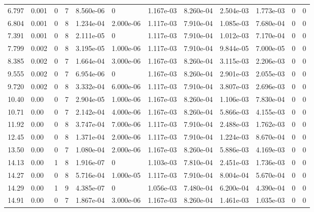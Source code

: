 \documentclass[preview]{standalone}
\begin{document}
{{\begin{tabular}{L{1.2cm}C{1.2cm} C{0.3cm}C{0.5cm} C{1.4cm}C{1.4cm} C{1.4cm}C{1.4cm} C{1.6cm}C{1.6cm} C{1.6cm}C{1.6cm}}
  6.797  &  0.001  & 0     &  7 &  8.560e-06  & 0  &  1.167e-03&   8.260e-04& 2.504e-03 & 1.773e-03   &  0 & 0  \\ 
  6.804  &  0.001  & 0     &  8 &  1.234e-04  & 2.000e-06  &  1.117e-03&   7.910e-04& 1.085e-03 & 7.680e-04   &  0 & 0  \\ 
  7.391  &  0.001  & 0     &  8 &  2.111e-05  & 0  &  1.117e-03&   7.910e-04& 1.012e-03 & 7.170e-04   &  0 & 0  \\ 
  7.799  &  0.002  & 0     &  8 &  3.195e-05  & 1.000e-06  &  1.117e-03&   7.910e-04& 9.844e-05 & 7.000e-05   &  0 & 0  \\ 
  8.385  &  0.002  & 0     &  7 &  1.664e-04  & 3.000e-06  &  1.167e-03&   8.260e-04& 3.115e-03 & 2.206e-03   &  0 & 0  \\ 
  9.555  &  0.002  & 0     &  7 &  6.954e-06  & 0  &  1.167e-03&   8.260e-04& 2.901e-03 & 2.055e-03   &  0 & 0  \\ 
  9.720  &  0.002  & 0     &  8 &  3.332e-04  & 6.000e-06  &  1.117e-03&   7.910e-04& 3.807e-03 & 2.696e-03   &  0 & 0  \\ 
  10.40  &  0.00  & 0     &  7 &  2.904e-05  & 1.000e-06  &  1.167e-03&   8.260e-04& 1.106e-03 & 7.830e-04   &  0 & 0  \\ 
  10.71  &  0.00  & 0     &  7 &  2.142e-04  & 4.000e-06  &  1.167e-03&   8.260e-04& 5.866e-03 & 4.155e-03   &  0 & 0  \\ 
  11.92  &  0.00  & 0     &  8 &  3.747e-04  & 7.000e-06  &  1.117e-03&   7.910e-04& 2.488e-03 & 1.762e-03   &  0 & 0  \\ 
  12.45  &  0.00  & 0     &  8 &  1.371e-04  & 2.000e-06  &  1.117e-03&   7.910e-04& 1.224e-03 & 8.670e-04   &  0 & 0  \\ 
  13.50  &  0.00  & 0     &  7 &  1.080e-04  & 2.000e-06  &  1.167e-03&   8.260e-04& 5.886e-03 & 4.169e-03   &  0 & 0  \\ 
  14.13  &  0.00  & 1     &  8 &  1.916e-07  & 0  &  1.103e-03&   7.810e-04& 2.451e-03 & 1.736e-03   &  0 & 0  \\ 
  14.27  &  0.00  & 0     &  8 &  5.716e-04  & 1.000e-05  &  1.117e-03&   7.910e-04& 8.004e-04 & 5.670e-04   &  0 & 0  \\ 
  14.29  &  0.00  & 1     &  9 &  4.385e-07  & 0  &  1.056e-03&   7.480e-04& 6.200e-04 & 4.390e-04   &  0 & 0  \\ 
  14.91  &  0.00  & 0     &  7 &  1.867e-04  & 3.000e-06  &  1.167e-03&   8.260e-04& 1.461e-03 & 1.035e-03   &  0 & 0  \\ 
\hline 
\end{tabular} 

}}
\end{document}
